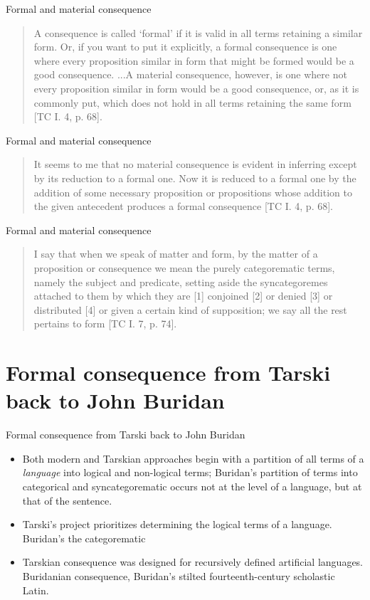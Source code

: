 \documentclass{beamer}
\begin{document}
\begin{frame}{Formal and material consequence}
	\begin{quote}
		A consequence is called `formal' if it is valid in all terms retaining a similar form. Or, if you want to put it explicitly, a formal consequence is one where every proposition similar in form that might be formed would be a good consequence.
		\pause 
		...A material consequence, however, is one where not every proposition similar in form would be a good consequence, or, as it is commonly put, which does not hold in all terms retaining the same form [TC I. 4, p. 68].
	\end{quote}
\end{frame}

\begin{frame}{Formal and material consequence}
	\begin{quote}
		It seems to me that no material consequence is evident in inferring except by its reduction to a formal one. Now it is reduced to a formal one by the addition of some necessary proposition or propositions whose addition to the given antecedent produces a formal consequence [TC I. 4, p. 68].
	\end{quote}
\end{frame}

\begin{frame}{Formal and material consequence}
	\begin{quote}
		I say that when we speak of matter and form, by the matter of a proposition or consequence we mean the purely categorematic terms, namely the subject and predicate, setting aside the syncategoremes attached to them by which they are [1] conjoined [2] or denied [3] or distributed [4] or given a certain kind of supposition; we say all the rest pertains to form [TC I. 7, p. 74].
	\end{quote}
\end{frame}

\section{Formal consequence from Tarski back to John Buridan}
\begin{frame}{Formal consequence from Tarski back to John Buridan}
	\begin{itemize}
		\pause 
		\item Both modern and Tarskian approaches begin with a partition of all terms of a \textit{language} into logical and non-logical terms; Buridan's partition of terms into categorical and syncategorematic occurs not at the level of a language, but at that of the sentence. 
		\pause 
		\item Tarski's project prioritizes determining the logical terms of a language. Buridan's the categorematic
		\pause
		\item Tarskian consequence was designed for recursively defined artificial languages. Buridanian consequence, Buridan's stilted fourteenth-century scholastic Latin. 
	\end{itemize}
\end{frame}
\end{document}
